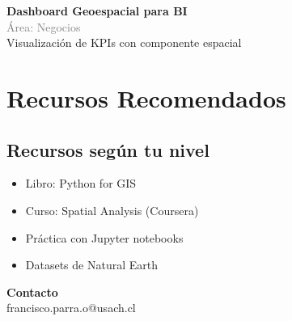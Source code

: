 \documentclass[11pt,a4paper]{article}
\begin{document}
\begin{tcolorbox}[colback=orange!5,colframe=darkorange,title={\small Proyecto Comercial \#2}]
\textbf{Dashboard Geoespacial para BI}\\[0.2cm]
\textcolor{gray}{\small Área: Negocios}\\[0.2cm]
Visualización de KPIs con componente espacial
\end{tcolorbox}


\section*{ Recursos Recomendados}

\subsection*{Recursos según tu nivel}

\begin{itemize}[leftmargin=*]
    \item Libro: Python for GIS
    \item Curso: Spatial Analysis (Coursera)
    \item Práctica con Jupyter notebooks
    \item Datasets de Natural Earth
\end{itemize}


\vspace{0.5cm}

\begin{tcolorbox}[colback=gray!10,colframe=gray!50]
\centering
\textbf{Contacto}\\[0.2cm]
 francisco.parra.o@usach.cl
\end{tcolorbox}
\end{document}

